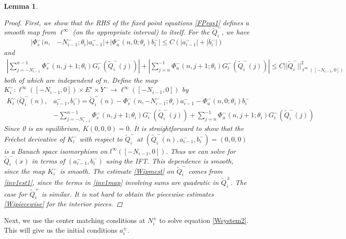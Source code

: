 \documentclass[12pt]{elsarticle}
\newtheorem{lemma}{Lemma}
\begin{document}
\begin{lemma}
\begin{proof}
First, we show that the RHS of the fixed point equations \eqref{FPeqs1} defines a smooth map from $\ell^\infty$ (on the appropriate interval) to itself. For the $\tilde{Q}_i^-$, we have
\begin{align}\label{inv1est1}
|\Phi_s^-(n, &-N_{i-1}^-; \theta_i) a_{i-1}^-| + |\Phi_u^-(n, 0; \theta_i) b_i^-| \leq C ( |a_{i-1}^-| + |b_i^-|) 
\end{align}
and
\begin{align*}
\left| \sum_{j = -N_{i-1}^-}^{n-1} \Phi_s^-(n, j+1; \theta_i) G_i^-(\tilde{Q}_i^-(j))\right| + \left|\sum_{j = n}^{-1} \Phi_u^-(n, j+1; \theta_i) G_i^-(\tilde{Q}_i^-(j))\right| 
\leq C ||\tilde{Q}_i^-||_{\ell^\infty([-N_{i-1}, 0])}^2 
\end{align*}
both of which are independent of $n$. Define the map
$K_i^-: \ell^\infty([-N_{i-1}, 0]) \times E^s \times Y^- \rightarrow \ell^\infty([-N_{i-1}, 0])$ by
\begin{align}\label{inv1map}
K_i^-(\tilde{Q}_i^-(n), &a_{i-1}^-, b_i^-) = \tilde{Q}_i^-(n) - \Phi_s^-(n, -N_{i-1}^-; \theta_i) a_{i-1}^- - \Phi_u^-(n, 0; \theta_i) b_i^-  \\
&- \sum_{j = -N_{i-1}^-}^{n-1} \Phi_s^-(n, j+1; \theta_i) G_i^-(\tilde{Q}_i^-(j)) + \sum_{j = n}^{-1} \Phi_u^-(n, j+1; \theta_i) G_i^-(\tilde{Q}_i^-(j)) \nonumber
\end{align}
Since 0 is an equilibrium, $K(0, 0, 0) = 0$. It is straightforward to show that the Fr\'echet derivative of $K_i^-$ with respect to $\tilde{Q}_i^-$ at $(\tilde{Q}_i^-(n), a_{i-1}^-, b_i^-) = (0, 0, 0)$ is a Banach space isomorphism on $l^\infty([-N_{i-1}, 0])$. Thus we can solve for $\tilde{Q}_i^-(x)$ in terms of $(a_{i-1}^-, b_i^-)$ using the IFT. This dependence is smooth, since the map $K_i^-$ is smooth. The estimate \eqref{Wipmest} on $\tilde{Q}_i^-$ comes from \eqref{inv1est1}, since the terms in \eqref{inv1map} involving sums are quadratic in $\tilde{Q}_i^\pm$. The case for $\tilde{Q}_i^+$ is similar. It is not hard to obtain the piecewise estimates \eqref{Wipiecewise} for the interior pieces.
\end{proof}
\end{lemma}

Next, we use the center matching conditions at $N_i^\pm$ to solve equation \ref{Wsystem2}. This will give us the initial conditions $a_i^\pm$.
\end{document}

